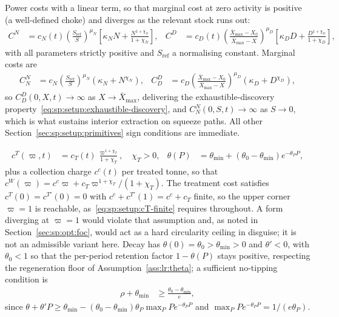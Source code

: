  Power costs with a linear term, so that marginal cost at zero activity is positive (a well-defined choke) and diverges as the relevant stock runs out:
\begin{align}
C^N &= c_N(t)\left(\frac{S_{\mathrm{ref}}}{S}\right)^{\mu_N}\left[\kappa_N N+\frac{N^{1+\chi_N}}{1+\chi_N}\right],
&
C^D &= c_D(t)\left(\frac{\bar X_{\max}-X_0}{\bar X_{\max}-X}\right)^{\mu_D}\left[\kappa_D D+\frac{D^{1+\chi_D}}{1+\chi_D}\right],
\label{eq:app:wh:costs}
\end{align}
with all parameters strictly positive and $S_{\mathrm{ref}}$ a normalising constant. Marginal costs are
\begin{align}
C^N_N &= c_N\left(\frac{S_{\mathrm{ref}}}{S}\right)^{\mu_N}\left(\kappa_N+N^{\chi_N}\right),
&
C^D_D &= c_D\left(\frac{\bar X_{\max}-X_0}{\bar X_{\max}-X}\right)^{\mu_D}\left(\kappa_D+D^{\chi_D}\right),
\label{eq:app:wh:mc}
\end{align}
so $C^D_D\left(0,X,t\right)\to\infty$ as $X\to\bar X_{\max}$, delivering the exhaustible-discovery property~\eqref{eq:sp:setup:exhaustible-discovery}, and $C^N_N\left(0,S,t\right)\to\infty$ as $S\to0$, which is what sustains interior extraction on squeeze paths. All other Section~\ref{sec:sp:setup:primitives} sign conditions are immediate.

\begin{align}
c^T\left(\varpi,t\right) &= c_T(t)\,\frac{\varpi^{1+\chi_T}}{1+\chi_T},\quad\chi_T>0,
&
\theta\left(P\right) &= \theta_{\min}+\left(\theta_0-\theta_{\min}\right)e^{-\theta_P P},
\label{eq:app:wh:waste-decay}
\end{align}
plus a collection charge $c^c(t)$ per treated tonne, so that $c^W\left(\varpi\right)=c^c\varpi+c_T\varpi^{1+\chi_T}/\left(1+\chi_T\right)$. The treatment cost satisfies $c^T\left(0\right)=c^{T\prime}\left(0\right)=0$ with $c^c+c^{T\prime}\left(1\right)=c^c+c_T$ finite, so the upper corner $\varpi=1$ is reachable, as~\eqref{eq:sp:setup:cT-finite} requires throughout. A form diverging at $\varpi=1$ would violate that assumption and, as noted in Section~\ref{sec:sp:opt:foc}, would act as a hard circularity ceiling in disguise; it is not an admissible variant here. Decay has $\theta\left(0\right)=\theta_0>\theta_{\min}>0$ and $\theta'<0$, with $\theta_0<1$ so that the per-period retention factor $1-\theta\left(P\right)$ stays positive, respecting the regeneration floor of Assumption~\ref{ass:lr:theta}; a sufficient no-tipping condition is
\begin{align}
\rho+\theta_{\min} &\ge \frac{\theta_0-\theta_{\min}}{e},
\label{eq:app:wh:notipping}
\end{align}
since $\theta+\theta'P\ge\theta_{\min}-\left(\theta_0-\theta_{\min}\right)\theta_P\max_P Pe^{-\theta_P P}$ and $\max_P Pe^{-\theta_P P}=1/\left(e\theta_P\right)$.

